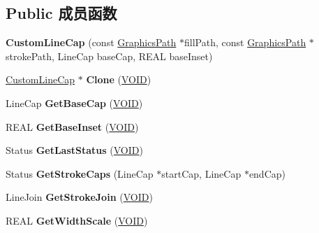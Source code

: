 \subsection*{Public 成员函数}
\begin{DoxyCompactItemize}
\item 
\mbox{\label{class_custom_line_cap_a0b3e0e1765d197e0c6b45c26da37d74a}} 
{\bfseries Custom\+Line\+Cap} (const \hyperlink{class_graphics_path}{Graphics\+Path} $\ast$fill\+Path, const \hyperlink{class_graphics_path}{Graphics\+Path} $\ast$stroke\+Path, Line\+Cap base\+Cap, R\+E\+AL base\+Inset)
\item 
\mbox{\label{class_custom_line_cap_a87365ba803c69a201110b045ccaee6fc}} 
\hyperlink{class_custom_line_cap}{Custom\+Line\+Cap} $\ast$ {\bfseries Clone} (\hyperlink{interfacevoid}{V\+O\+ID})
\item 
\mbox{\label{class_custom_line_cap_ad87708fa3494e28453e953f3f8bf8199}} 
Line\+Cap {\bfseries Get\+Base\+Cap} (\hyperlink{interfacevoid}{V\+O\+ID})
\item 
\mbox{\label{class_custom_line_cap_a17caf13ed465571d1424cd0dc95273dd}} 
R\+E\+AL {\bfseries Get\+Base\+Inset} (\hyperlink{interfacevoid}{V\+O\+ID})
\item 
\mbox{\label{class_custom_line_cap_aa5cdb767c09654d7bbab123e22bfea3c}} 
Status {\bfseries Get\+Last\+Status} (\hyperlink{interfacevoid}{V\+O\+ID})
\item 
\mbox{\label{class_custom_line_cap_a5d0f8b1337dc1876586356264bcde7c6}} 
Status {\bfseries Get\+Stroke\+Caps} (Line\+Cap $\ast$start\+Cap, Line\+Cap $\ast$end\+Cap)
\item 
\mbox{\label{class_custom_line_cap_a71a06cf1a524dac830fe8d19dd7a1bc7}} 
Line\+Join {\bfseries Get\+Stroke\+Join} (\hyperlink{interfacevoid}{V\+O\+ID})
\item 
\mbox{\label{class_custom_line_cap_aed8027b20d359a891a169ae7851bea7e}} 
R\+E\+AL {\bfseries Get\+Width\+Scale} (\hyperlink{interfacevoid}{V\+O\+ID})
\item 

\end{DoxyCompactItemize}
